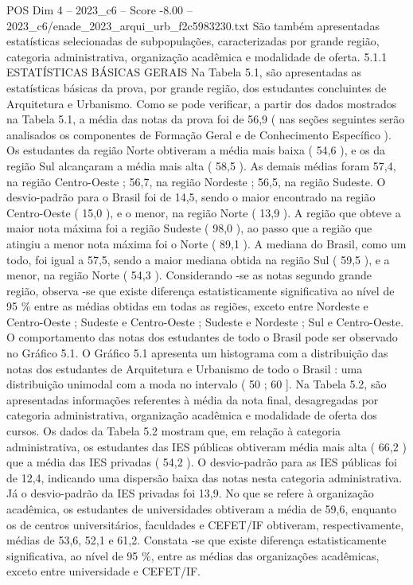 \begin{textsample}{POS Dim 4 – 2023\_c6 – Score -8.00 – 2023\_c6/enade\_2023\_arqui\_urb\_f2c5983230.txt}
São também apresentadas estatísticas selecionadas de subpopulações, caracterizadas por grande região, categoria administrativa, organização acadêmica e modalidade de oferta. 5.1.1 ESTATÍSTICAS BÁSICAS GERAIS Na Tabela 5.1, são apresentadas as estatísticas básicas da prova, por grande região, dos estudantes concluintes de Arquitetura e Urbanismo.
Como se pode verificar, a partir dos dados mostrados na Tabela 5.1, a média das notas da prova foi de 56,9 ( nas seções seguintes serão analisados os componentes de Formação Geral e de Conhecimento Específico ).
Os estudantes da região Norte obtiveram a média mais baixa ( 54,6 ), e os da região Sul alcançaram a média mais alta ( 58,5 ).
As demais médias foram 57,4, na região Centro-Oeste ; 56,7, na região Nordeste ; 56,5, na região Sudeste.
O desvio-padrão para o Brasil foi de 14,5, sendo o maior encontrado na região Centro-Oeste ( 15,0 ), e o menor, na região Norte ( 13,9 ).
A região que obteve a maior nota máxima foi a região Sudeste ( 98,0 ), ao passo que a região que atingiu a menor nota máxima foi o Norte ( 89,1 ).
A mediana do Brasil, como um todo, foi igual a 57,5, sendo a maior mediana obtida na região Sul ( 59,5 ), e a menor, na região Norte ( 54,3 ).
Considerando -se as notas segundo grande região, observa -se que existe diferença estatisticamente significativa ao nível de 95 \% entre as médias obtidas em todas as regiões, exceto entre Nordeste e Centro-Oeste ; Sudeste e Centro-Oeste ; Sudeste e Nordeste ; Sul e Centro-Oeste.
O comportamento das notas dos estudantes de todo o Brasil pode ser observado no Gráfico 5.1.
O Gráfico 5.1 apresenta um histograma com a distribuição das notas dos estudantes de Arquitetura e Urbanismo de todo o Brasil : uma distribuição unimodal com a moda no intervalo ( 50 ; 60 ].
Na Tabela 5.2, são apresentadas informações referentes à média da nota final, desagregadas por categoria administrativa, organização acadêmica e modalidade de oferta dos cursos.
Os dados da Tabela 5.2 mostram que, em relação à categoria administrativa, os estudantes das IES públicas obtiveram média mais alta ( 66,2 ) que a média das IES privadas ( 54,2 ).
O desvio-padrão para as IES públicas foi de 12,4, indicando uma dispersão baixa das notas nesta categoria administrativa.
Já o desvio-padrão da IES privadas foi 13,9.
No que se refere à organização acadêmica, os estudantes de universidades obtiveram a média de 59,6, enquanto os de centros universitários, faculdades e CEFET/IF obtiveram, respectivamente, médias de 53,6, 52,1 e 61,2.
Constata -se que existe diferença estatisticamente significativa, ao nível de 95 \%, entre as médias das organizações acadêmicas, exceto entre universidade e CEFET/IF.

\end{textsample}
